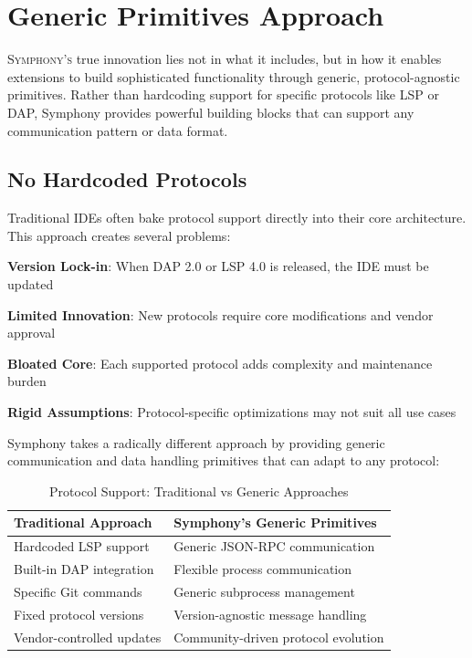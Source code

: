 
\section*{Generic Primitives Approach}

\lettrine{S}{ymphony's} true innovation lies not in what it includes, but in how it enables extensions to build sophisticated functionality through generic, protocol-agnostic primitives. Rather than hardcoding support for specific protocols like LSP or DAP, Symphony provides powerful building blocks that can support any communication pattern or data format.

\vspace{0.5cm}
\subsection*{No Hardcoded Protocols}

Traditional IDEs often bake protocol support directly into their core architecture. This approach creates several problems:

\begin{compactlist}
    \item \textbf{Version Lock-in}: When DAP 2.0 or LSP 4.0 is released, the IDE must be updated
    \item \textbf{Limited Innovation}: New protocols require core modifications and vendor approval
    \item \textbf{Bloated Core}: Each supported protocol adds complexity and maintenance burden
    \item \textbf{Rigid Assumptions}: Protocol-specific optimizations may not suit all use cases
\end{compactlist}

Symphony takes a radically different approach by providing generic communication and data handling primitives that can adapt to any protocol:

\begin{table}[ht]
\centering
\begin{tabular}{@{}p{}p{}@{}}
\toprule
\textbf{Traditional Approach} & \textbf{Symphony's Generic Primitives} \\
\midrule
Hardcoded LSP support & Generic JSON-RPC communication \\
Built-in DAP integration & Flexible process communication \\
Specific Git commands & Generic subprocess management \\
Fixed protocol versions & Version-agnostic message handling \\
Vendor-controlled updates & Community-driven protocol evolution \\
\bottomrule
\end{tabular}
\caption{Protocol Support: Traditional vs Generic Approaches}
\end{table}

